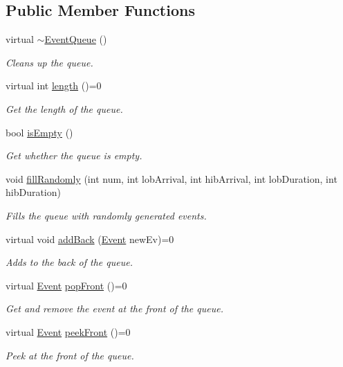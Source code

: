 \subsection*{Public Member Functions}
\begin{DoxyCompactItemize}
\item 
virtual \hyperlink{class_event_queue_ac57db8e2366f2c6c594e6afc975e3b59}{$\sim$\+Event\+Queue} ()
\begin{DoxyCompactList}\small\item\em Cleans up the queue. \end{DoxyCompactList}\item 
virtual int \hyperlink{class_event_queue_afc947be4a7122a4dd9a7ede8a7048f5c}{length} ()=0
\begin{DoxyCompactList}\small\item\em Get the length of the queue. \end{DoxyCompactList}\item 
bool \hyperlink{class_event_queue_aa29d017edc0198d2113018d71d19369c}{is\+Empty} ()
\begin{DoxyCompactList}\small\item\em Get whether the queue is empty. \end{DoxyCompactList}\item 
void \hyperlink{class_event_queue_ad74cde47893e33c1288344f308c394d0}{fill\+Randomly} (int num, int lob\+Arrival, int hib\+Arrival, int lob\+Duration, int hib\+Duration)
\begin{DoxyCompactList}\small\item\em Fills the queue with randomly generated events. \end{DoxyCompactList}\item 
virtual void \hyperlink{class_event_queue_ada350083afd0db585c0e023336e57d7b}{add\+Back} (\hyperlink{struct_event}{Event} new\+Ev)=0
\begin{DoxyCompactList}\small\item\em Adds to the back of the queue. \end{DoxyCompactList}\item 
virtual \hyperlink{struct_event}{Event} \hyperlink{class_event_queue_a4f49434cc8ca60030f2b5737399527e2}{pop\+Front} ()=0
\begin{DoxyCompactList}\small\item\em Get and remove the event at the front of the queue. \end{DoxyCompactList}\item 
virtual \hyperlink{struct_event}{Event} \hyperlink{class_event_queue_ab16064eee197687eca21cedde00ab2ac}{peek\+Front} ()=0
\begin{DoxyCompactList}\small\item\em Peek at the front of the queue. \end{DoxyCompactList}\end{DoxyCompactItemize}


